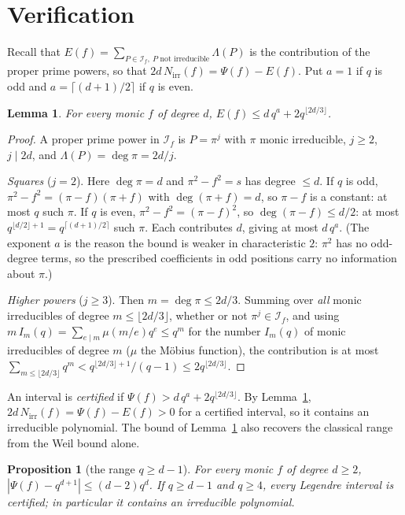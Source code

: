 \documentclass[11pt,a4paper]{article}
\newtheorem{lemma}[theorem]{Lemma}
\newtheorem{proposition}[theorem]{Proposition}
\theoremstyle{definition}
\theoremstyle{remark}
\newcommand{\cI}{\mathcal{I}}
\newcommand{\Nirr}{N_{\mathrm{irr}}}
\begin{document}
\section{Verification}\label{sec:verification}

Recall that $E(f)=\sum_{P\in\cI_f,\ P\text{ not irreducible}}\Lambda(P)$ is the contribution of the
proper prime powers, so that $2d\,\Nirr(f)=\Psi(f)-E(f)$. Put $a=1$ if $q$ is odd and
$a=\lceil(d+1)/2\rceil$ if $q$ is even.

\begin{lemma}\label{lem:E}
For every monic $f$ of degree $d$, $E(f)\le d\,q^a+2q^{\lfloor2d/3\rfloor}$.
\end{lemma}

\begin{proof}
A proper prime power in $\cI_f$ is $P=\pi^j$ with $\pi$ monic irreducible, $j\ge2$, $j\mid2d$, and
$\Lambda(P)=\deg\pi=2d/j$.

\emph{Squares} ($j=2$). Here $\deg\pi=d$ and $\pi^2-f^2=s$ has degree $\le d$. If $q$ is odd,
$\pi^2-f^2=(\pi-f)(\pi+f)$ with $\deg(\pi+f)=d$, so $\pi-f$ is a constant: at most $q$ such $\pi$.
If $q$ is even, $\pi^2-f^2=(\pi-f)^2$, so $\deg(\pi-f)\le d/2$: at most
$q^{\lfloor d/2\rfloor+1}=q^{\lceil(d+1)/2\rceil}$ such $\pi$. Each contributes $d$, giving at most $d\,q^a$.
(The exponent $a$ is the reason the bound is weaker in characteristic $2$: $\pi^2$ has no odd-degree
terms, so the prescribed coefficients in odd positions carry no information about $\pi$.)

\emph{Higher powers} ($j\ge3$). Then $m=\deg\pi\le2d/3$. Summing over \emph{all} monic irreducibles
of degree $m\le\lfloor2d/3\rfloor$, whether or not $\pi^j\in\cI_f$, and using
$m\,I_m(q)=\sum_{e\mid m}\mu(m/e)q^e\le q^m$ for the number $I_m(q)$ of monic irreducibles of degree
$m$ ($\mu$ the M\"obius function), the contribution is at most
$\sum_{m\le\lfloor2d/3\rfloor}q^m<q^{\lfloor2d/3\rfloor+1}/(q-1)\le2q^{\lfloor2d/3\rfloor}$.
\end{proof}

An interval is \emph{certified} if $\Psi(f)>d\,q^a+2q^{\lfloor2d/3\rfloor}$. By Lemma~\ref{lem:E},
$2d\,\Nirr(f)=\Psi(f)-E(f)>0$ for a certified interval, so it contains an irreducible polynomial.
The bound of Lemma~\ref{lem:E} also recovers the classical range from the Weil bound alone.

\begin{proposition}[the range $q\ge d-1$]\label{prop:classical}
For every monic $f$ of degree $d\ge2$, $|\Psi(f)-q^{d+1}|\le(d-2)q^d$. If $q\ge d-1$ and $q\ge4$,
every Legendre interval is certified; in particular it contains an irreducible polynomial.
\end{proposition}
\end{document}
